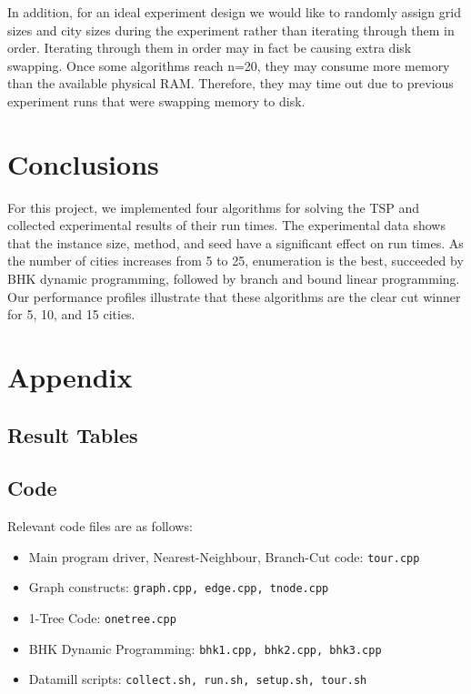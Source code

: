 \documentclass[11pt]{article}
\begin{document}
	In addition, for an ideal experiment design we would like to randomly assign grid sizes and city sizes during the experiment rather than iterating through them in order. Iterating through them in order may in fact be causing extra disk swapping. Once some algorithms reach n=20, they may consume more memory than the available physical RAM. Therefore, they may time out due to previous experiment runs that were swapping memory to disk. 
	
	\section{Conclusions}
	\label{sec:conclusions}
	For this project, we implemented four algorithms for solving the TSP and collected experimental results of their run times. The experimental data shows that the instance size, method, and seed have a significant effect on run times. As the number of cities increases from 5 to 25, enumeration is the best, succeeded by BHK dynamic programming, followed by branch and bound linear programming. Our performance profiles illustrate that these algorithms are the clear cut winner for 5, 10, and 15 cities. 
	
	
	\nocite{*}
	
	
	
	\section*{Appendix}
	\subsection*{Result Tables}
	\subsection*{Code}
	Relevant code files are as follows:
	
	\begin{itemize}
		\item Main program driver, Nearest-Neighbour, Branch-Cut code: \texttt{tour.cpp}
		\item Graph constructs: \texttt{graph.cpp, edge.cpp, tnode.cpp}
		\item 1-Tree Code: \texttt{onetree.cpp}
		\item BHK Dynamic Programming: \texttt{bhk1.cpp, bhk2.cpp, bhk3.cpp}
		\item Datamill scripts: \texttt{collect.sh, run.sh, setup.sh, tour.sh}
	\end{itemize}
	
	
	
\end{document}
